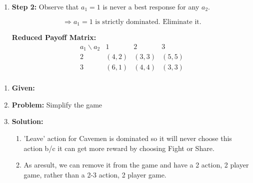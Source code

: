 \begin{example}
\begin{enumerate}
\begin{enumerate}
            \item \textbf{Step 2:} Observe that $a_1 = 1$ is never a best response for any $a_2$.
        
            \[
            \Rightarrow a_1 = 1 \text{ is strictly dominated. Eliminate it.}
            \]
        
            \textbf{Reduced Payoff Matrix:}
            \[
            \begin{array}{c|c|c|c}
            a_1 \backslash a_2 & 1 & 2 & 3 \\
            \hline
            2 & (4,2) & (3,3) & (5,5) \\
            3 & (6,1) & (4,4) & (3,3) \\
            \end{array}
            \]
        \end{enumerate}
    
    \end{enumerate}
\end{example}
\newpage

\begin{example}
    \begin{enumerate}
        \item \textbf{Given:} 
        \item \textbf{Problem:} Simplify the game 
        \item \textbf{Solution:}
        \begin{enumerate}
            \item 'Leave' action for Cavemen is dominated so it will never choose this action b/c it can get more reward by choosing Fight or Share. 
            \item As aresult, we can remove it from the game and have a 2 action, 2 player game, rather than a 2-3 action, 2 player game.
        \end{enumerate}
    \end{enumerate}
\end{example}
\newpage

